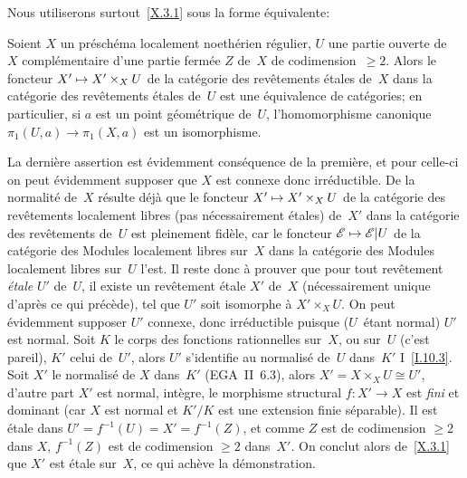 Nous utiliserons surtout~\ref{X.3.1} sous la forme \'equivalente:

\begin{corollaire}
\label{X.3.3}
Soient $X$ un pr\'esch\'ema localement noeth\'erien
r\'egulier, $U$ une partie ouverte de~$X$ com\-pl\'e\-men\-taire
d'une partie ferm\'ee $Z$ de~$X$ de codimension~$\ge 2$. Alors le
foncteur $X'\mto X'\times_X U$ de la cat\'egorie des
rev\^etements \'etales de~$X$ dans la cat\'egorie des
rev\^etements \'etales de~$U$ est une \'equivalence
de cat\'egories; en particulier, si $a$ est un point
g\'eom\'etrique de~$U$, l'homomorphisme canonique $\pi_1(U,a)\to
\pi_1(X,a)$ est un isomorphisme.
\end{corollaire}

La derni\`ere assertion est \'evidemment cons\'equence de la
premi\`ere, et pour celle-ci on peut \'evidemment supposer que $X$
est connexe donc irr\'eductible. De la normalit\'e de~$X$
r\'esulte d\'ej\`a que le foncteur $X'\mto X'\times_X U$ de
la cat\'egorie des rev\^etements localement libres (pas
n\'ecessairement \'etales) de~$X'$ dans la cat\'egorie des
rev\^etements de~$U$ est pleinement fid\`ele, car le foncteur
$\cal{E}\mto\cal{E}\vert U$ de la cat\'egorie des Modules
localement libres sur~$X$ dans la cat\'egorie des Modules localement
libres sur~$U$ l'est. Il reste donc \`a prouver que pour tout
rev\^etement \emph{étale} $U'$ de~$U$, il existe un
rev\^etement \'etale $X'$ de~$X$ (n\'ecessairement unique
d'apr\`es ce qui pr\'ec\`ede), tel que $U'$ soit isomorphe \`a
$X'\times_X U$. On peut \'evidemment supposer $U'$ connexe, donc
irr\'eductible puisque ($U$~\'etant normal) $U'$ est normal. Soit
$K$ le corps des fonctions rationnelles sur~$X$, ou sur~$U$ (c'est
pareil), $K'$ celui de~$U'$, alors $U'$ s'identifie au normalis\'e
de~$U$ dans~$K'$ I~\ref{I.10.3}. Soit $X'$ le normalis\'e de
$X$ dans~$K'$ (EGA~II~6.3), alors $X'=X\times_X U \cong U'$, d'autre
part $X'$ est normal, int\`egre, le morphisme structural $f\colon
X'\to X$ est \emph{fini} et dominant (car $X$ est normal et $K'/K$ est
une extension finie s\'eparable). Il est \'etale dans
$U'=f^{-1}(U)=X'=f^{-1}(Z)$, et comme $Z$ est de codimension $\ge 2$
dans $X$, $f^{-1}(Z)$ est de codimension $\ge 2$ dans~$X'$. On conclut
alors de~\ref{X.3.1} que $X'$ est \'etale sur~$X$, ce qui ach\`eve
la d\'emonstration.

